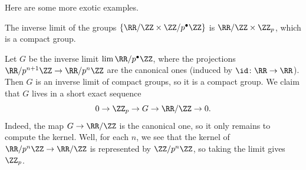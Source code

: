 \documentclass[../notes.tex]{subfiles}
\begin{document}
Here are some more exotic examples.
\begin{example}
	The inverse limit of the groups $\{\RR/\ZZ\times\ZZ/p^\bullet\ZZ\}$ is $\RR/\ZZ\times\ZZ_p$, which is a compact group.
\end{example}
\begin{example}
	Let $G$ be the inverse limit $\lim\RR/p^\bullet\ZZ$, where the projections $\RR/p^{n+1}\ZZ\to\RR/p^n\ZZ$ are the canonical ones (induced by $\id\colon\RR\to\RR$). Then $G$ is an inverse limit of compact groups, so it is a compact group. We claim that $G$ lives in a short exact sequence
	\[0\to\ZZ_p\to G\to\RR/\ZZ\to0.\]
	Indeed, the map $G\to\RR/\ZZ$ is the canonical one, so it only remains to compute the kernel. Well, for each $n$, we see that the kernel of $\RR/p^n\ZZ\to\RR/\ZZ$ is represented by $\ZZ/p^n\ZZ$, so taking the limit gives $\ZZ_p$.
\end{example}
\end{document}
